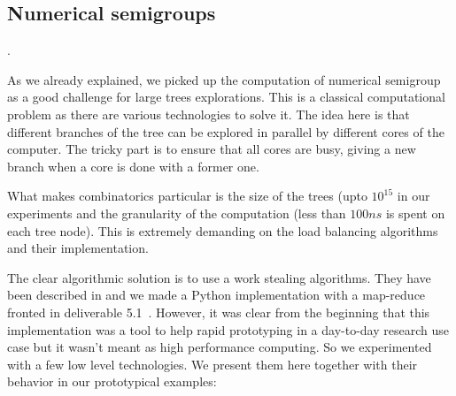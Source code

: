 \documentclass{deliverablereport}
\begin{document}

\subsection{Numerical semigroups}
\label{subsec:numerical-semigroups}.

As we already explained, we picked up the computation of numerical semigroup
as a good challenge for large trees explorations. This is a classical
computational problem as there are various technologies to solve it. The idea
here is that different branches of the tree can be explored in parallel by
different cores of the computer. The tricky part is to ensure that all cores
are busy, giving a new branch when a core is done with a former one.

What makes combinatorics particular is the size of the trees (upto $10^{15}$
in our experiments and the granularity of the computation (less than $100ns$
is spent on each tree node). This is extremely demanding on the load balancing
algorithms and their implementation.

The clear algorithmic solution is to use a work stealing algorithms. They have
been described in \cite{10.1109/SFCS.1994.365680, BlumofeL99} and we made a
Python implementation with a map-reduce fronted in deliverable
5.1~\cite{map-reduce}. However, it was clear from the beginning that this
implementation was a tool to help rapid prototyping in a day-to-day research
use case but it wasn't meant as high performance computing. So we experimented
with a few low level technologies. We present them here together with their
behavior in our prototypical examples:
\end{document}

